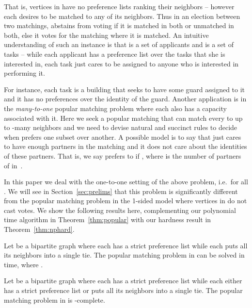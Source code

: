 \documentclass[11pt]{llncs}
\begin{document}
That is, vertices in  have no preference lists ranking their neighbors -- however each 
 desires to be matched to any of its neighbors. Thus in an election between two 
matchings,  abstains from voting if it is matched in both or unmatched in both, else it 
votes for the matching where it is matched. An intuitive understanding of such an instance 
is that  is a set of applicants and  is a set of tasks -- while each applicant has a 
preference list over the tasks that she is interested in, each task just cares to be assigned 
to anyone who is interested in performing it. 

For instance, each task is a building that seeks to have some guard assigned to it and it has no 
preferences over the identity of the guard. Another application is in the {\em many-to-one} 
popular matching problem  where each  also has a capacity  associated with 
it. Here we seek a popular matching that can match every  to up to -many 
neighbors and we need to devise natural and succinct rules to decide when  prefers one subset 
over another. A possible model is to say that  just cares to have enough partners in the 
matching and it does not care about the identities of these partners. That is, we say  
prefers  to  if , where  is the number of 
partners of  in~. 

In this paper we deal with the one-to-one setting of the above problem, i.e.\ 
for all . We will see in 
Section~\ref{sec:prelims} that this problem is significantly different 
from the popular matching problem in the 1-sided model where vertices in  do not cast votes.  
We show the following results here, complementing our polynomial time algorithm in 
Theorem~\ref{thm:popular} with our hardness result in Theorem~\ref{thm:nphard}.

\begin{theorem}
\label{thm:popular}
Let  be a bipartite graph where each  has a strict preference list 
while each  puts all its neighbors into a single tie. The popular 
matching problem in  can be solved in  time, where .
\end{theorem}

\begin{theorem}
\label{thm:nphard}
Let  be a bipartite graph where each  has a strict preference list 
while each  either has a strict preference list or puts all its neighbors into a single 
tie. The popular matching problem in  is -complete. 
\end{theorem}
 
\end{document}
